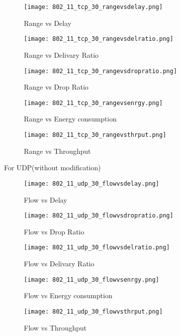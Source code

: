 \documentclass{report}
\begin{document}
\begin{figure}
  \caption{Range vs Delay}
  \centering
    \texttt{[image: 802\_11\_tcp\_30\_rangevsdelay.png]}
\end{figure}
\begin{figure}
  \caption{Range vs Delivary Ratio}
  \centering
    \texttt{[image: 802\_11\_tcp\_30\_rangevsdelratio.png]}
\end{figure}
\begin{figure}
  \caption{Range vs Drop Ratio}
  \centering
    \texttt{[image: 802\_11\_tcp\_30\_rangevsdropratio.png]}
\end{figure}
\begin{figure}
  \caption{Range vs Energy consumption}
  \centering
    \texttt{[image: 802\_11\_tcp\_30\_rangevsenrgy.png]}
\end{figure}
\begin{figure}
  \caption{Range vs Throughput}
  \centering
    \texttt{[image: 802\_11\_tcp\_30\_rangevsthrput.png]}
\end{figure}

For UDP(without modification)
\begin{figure}
  \caption{Flow vs Delay}
  \centering
    \texttt{[image: 802\_11\_udp\_30\_flowvsdelay.png]}
\end{figure}
\begin{figure}
  \caption{Flow vs Drop Ratio}
  \centering
    \texttt{[image: 802\_11\_udp\_30\_flowvsdropratio.png]}
\end{figure}
\begin{figure}
  \caption{Flow vs Delivary Ratio}
  \centering
    \texttt{[image: 802\_11\_udp\_30\_flowvsdelratio.png]}
\end{figure}
\begin{figure}
  \caption{Flow vs Energy consumption}
  \centering
    \texttt{[image: 802\_11\_udp\_30\_flowvsenrgy.png]}
\end{figure}
\begin{figure}
  \caption{Flow vs Throughput}
  \centering
    \texttt{[image: 802\_11\_udp\_30\_flowvsthrput.png]}
\end{figure}
\end{document}
